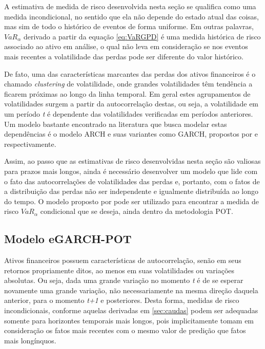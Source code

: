 \documentclass[1p]{elsarticle}
\theoremstyle{definition}
\begin{document}
A estimativa de medida de risco desenvolvida nesta seção se qualifica como uma medida incondicional, no sentido que ela não depende do estado atual das coisas, mas sim de todo o histórico de eventos de forma uniforme. Em outras palavras, $VaR_\alpha$ derivado a partir da equação \eqref{eq:VaRGPD} é uma medida histórica de risco associado ao ativo em análise, o qual não leva em consideração se nos eventos mais recentes a volatilidade das perdas pode ser diferente do valor histórico.

De fato, uma das características marcantes das perdas dos ativos financeiros é o chamado \emph{clustering} de volatilidade, onde grandes volatilidades têm tendência a ficarem próximas ao longo da linha temporal. Em geral estes agrupamentos de volatilidades surgem a partir da autocorrelação destas, ou seja, a volatilidade em um período \emph{t} é dependente das volatilidades verificadas em períodos anteriores. Um modelo bastante encontrado na literatura que busca modelar estas dependências é o modelo ARCH e suas variantes como GARCH, propostos por \cite{Engle1982} e \cite{Bollerslev1986} respectivamente.

Assim, ao passo que as estimativas de risco desenvolvidas nesta seção são valiosas para prazos mais longos, ainda é necessário desenvolver um modelo que lide com o fato das autocorrelações de volatilidades das perdas e, portanto, com o fatos de a distribuição das perdas não ser independente e igualmente distribuída ao longo do tempo. O modelo proposto por \cite{McNeil2000} pode ser utilizado para encontrar a medida de risco $VaR_\alpha$ condicional que se deseja, ainda dentro da metodologia POT.

\subsection{Modelo eGARCH-POT}
\label{sec:egarchpot}

Ativos financeiros possuem características de autocorrelação, senão em seus retornos propriamente ditos, ao menos em suas volatilidades ou variações absolutas. Ou seja, dada uma grande variação no momento \emph{t} é de se esperar novamente uma grande variação, não necessariamente na mesma direção daquela anterior, para o momento \emph{t+1} e posteriores. Desta forma, medidas de risco incondicionais, conforme aquelas derivadas em \ref{sec:caudas} podem ser adequadas somente para horizontes temporais mais longos, pois implicitamente tomam em consideração os fatos mais recentes com o mesmo valor de predição que fatos mais longínquos.
\end{document}
